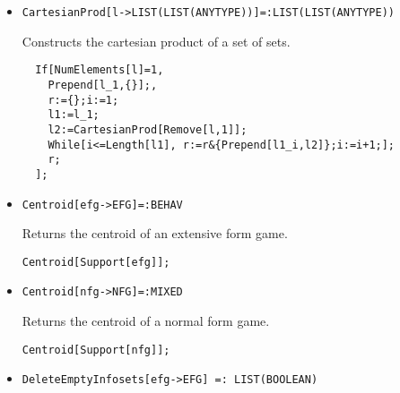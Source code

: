 \begin{itemize}
{\it for} {\tt T = FLOAT, RATIONAL}
\bd 
Converts a nested list of numbers into a Behavior strategy
profile for the game \verb+efg+.
\begin{verbatim}
Behav[Support[efg],list];
\end{verbatim} 
\ed

\item{}
\protect \large \begin{verbatim}
CartesianProd[l->LIST(LIST(ANYTYPE))]=:LIST(LIST(ANYTYPE))
\end{verbatim}\normalsize

\bd 
Constructs the cartesian product of a set of sets.  
\begin{verbatim}
  If[NumElements[l]=1,
    Prepend[l_1,{}];,
    r:={};i:=1;
    l1:=l_1;
    l2:=CartesianProd[Remove[l,1]];
    While[i<=Length[l1], r:=r&{Prepend[l1_i,l2]};i:=i+1;];
    r;
  ];
\end{verbatim} 
\ed
	

\item{}
\protect \large \begin{verbatim}
Centroid[efg->EFG]=:BEHAV
\end{verbatim}\normalsize

\bd 
Returns the centroid of an extensive form game.  
\begin{verbatim}
Centroid[Support[efg]];
\end{verbatim} 
\ed

\item{}
\protect \large \begin{verbatim}
Centroid[nfg->NFG]=:MIXED
\end{verbatim}\normalsize

\bd 
Returns the centroid of a normal form game.  
\begin{verbatim}
Centroid[Support[nfg]];
\end{verbatim} 
\ed



\item{}
\protect \large \begin{verbatim}
DeleteEmptyInfosets[efg->EFG] =: LIST(BOOLEAN)
\end{verbatim}\normalsize


\end{itemize}
